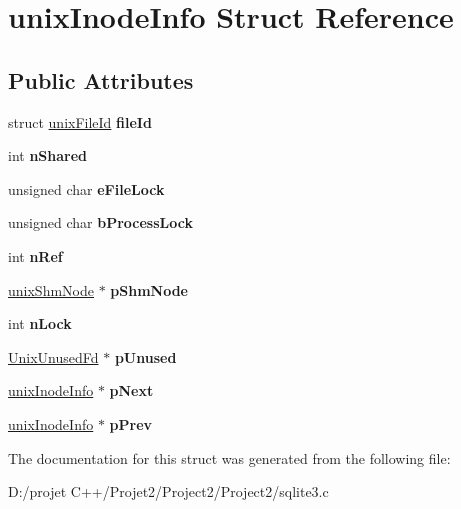 \hypertarget{structunix_inode_info}{}\section{unix\+Inode\+Info Struct Reference}
\label{structunix_inode_info}
\subsection*{Public Attributes}
\begin{DoxyCompactItemize}
\item 
\mbox{\label{structunix_inode_info_ae692731d449f4462a921dda9a061faa6}} 
struct \mbox{\hyperlink{structunix_file_id}{unix\+File\+Id}} {\bfseries file\+Id}
\item 
\mbox{\label{structunix_inode_info_a0d7f8dd92964f53e59c8d741dbe00a61}} 
int {\bfseries n\+Shared}
\item 
\mbox{\label{structunix_inode_info_a010a765bb3feecb16b650f68fc3a3c1f}} 
unsigned char {\bfseries e\+File\+Lock}
\item 
\mbox{\label{structunix_inode_info_ade689e4231dd80bb33c86da1e5ed1586}} 
unsigned char {\bfseries b\+Process\+Lock}
\item 
\mbox{\label{structunix_inode_info_a65cbd1fd05ed00f03a252266b04a8221}} 
int {\bfseries n\+Ref}
\item 
\mbox{\label{structunix_inode_info_a302a8b82e27d5b3624ec122bc9c2ed61}} 
\mbox{\hyperlink{structunix_shm_node}{unix\+Shm\+Node}} $\ast$ {\bfseries p\+Shm\+Node}
\item 
\mbox{\label{structunix_inode_info_a477f3357a32adbc1a9b05017e535444d}} 
int {\bfseries n\+Lock}
\item 
\mbox{\label{structunix_inode_info_a0dda9ad35734fa161d1f0b13b671c1c6}} 
\mbox{\hyperlink{struct_unix_unused_fd}{Unix\+Unused\+Fd}} $\ast$ {\bfseries p\+Unused}
\item 
\mbox{\label{structunix_inode_info_a80181ba4ef71dd0d8e55e97baedc761e}} 
\mbox{\hyperlink{structunix_inode_info}{unix\+Inode\+Info}} $\ast$ {\bfseries p\+Next}
\item 
\mbox{\label{structunix_inode_info_a6575edce9898b48870c6f48047c01d01}} 
\mbox{\hyperlink{structunix_inode_info}{unix\+Inode\+Info}} $\ast$ {\bfseries p\+Prev}
\end{DoxyCompactItemize}


The documentation for this struct was generated from the following file\+:\begin{DoxyCompactItemize}
\item 
D\+:/projet C++/\+Projet2/\+Project2/\+Project2/sqlite3.\+c\end{DoxyCompactItemize}
